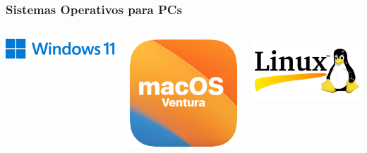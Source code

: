 \begin{frame}
\frametitle{Sistemas Operativos para PCs}  

\begin{columns}
\begin{center}
\includegraphics[width=0.95\linewidth]{00_IntroProgramacionYMoviles/Windows11.png} 
\end{center}

\begin{center}
\includegraphics[width=0.95\linewidth]{00_IntroProgramacionYMoviles/MacOS.png} 
\end{center}

\begin{center}
\includegraphics[width=0.95\linewidth]{00_IntroProgramacionYMoviles/Linux.png} 
\end{center}
\end{columns}

\end{frame}






